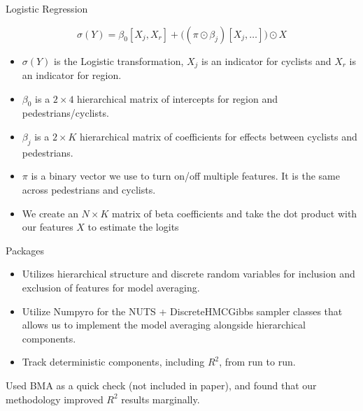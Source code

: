 \documentclass{beamer}
\begin{document}
\begin{frame}{Logistic Regression}

\begin{equation}
\sigma(Y) = \beta_0[X_j, X_r] + \Big((\pi \odot \beta_{j})[X_j, \dots]\Big) \odot X
\end{equation}

\begin{itemize}
    \item $\sigma(Y)$ is the Logistic transformation, $X_j$ is an indicator for cyclists and $X_r$ is an indicator for region.
    \item $\beta_0$ is a $2 \times 4$ hierarchical matrix of intercepts for region and pedestrians/cyclists.
    \item $\beta_j$ is a $2 \times K$ hierarchical matrix of coefficients for effects between cyclists and pedestrians.  
    \item $\pi$ is a binary vector we use to turn on/off multiple features. It is the 
    same across pedestrians and cyclists.
    \item We create an $N \times K$ matrix of beta coefficients
    and take the dot product with our features $X$ to estimate the logits 
\end{itemize}

\end{frame}

\begin{frame}{Packages}

\begin{itemize}

\item Utilizes hierarchical structure and discrete random variables
for inclusion and exclusion of features for model averaging. 
\item Utilize Numpyro\cite{phan_composable_2019} for the NUTS + DiscreteHMCGibbs sampler classes that allows us to implement the model averaging alongside hierarchical components.
\item Track deterministic components, including $R^2$, from run to run.

\end{itemize}

Used BMA\cite{raftery_bma_2022} as a quick check (not included in paper), and 
found that our methodology improved $R^2$ results marginally.
\end{frame}
\end{document}
